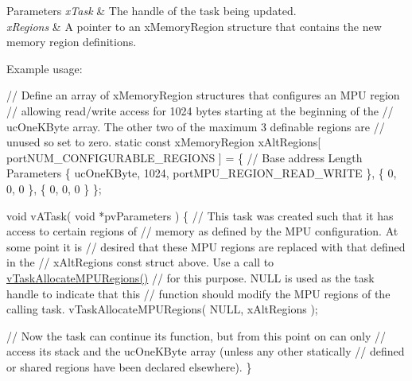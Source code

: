 \begin{DoxyParams}{Parameters}
{\em x\+Task} & The handle of the task being updated.\\
\hline
{\em x\+Regions} & A pointer to an x\+Memory\+Region structure that contains the new memory region definitions.\\
\hline
\end{DoxyParams}
Example usage\+: 
\begin{DoxyPre}
// Define an array of xMemoryRegion structures that configures an MPU region
// allowing read/write access for 1024 bytes starting at the beginning of the
// ucOneKByte array.  The other two of the maximum 3 definable regions are
// unused so set to zero.
static const xMemoryRegion xAltRegions[ portNUM\_CONFIGURABLE\_REGIONS ] =
\{
    // Base address     Length      Parameters
    \{ ucOneKByte,       1024,       portMPU\_REGION\_READ\_WRITE \},
    \{ 0,                0,          0 \},
    \{ 0,                0,          0 \}
\};\end{DoxyPre}



\begin{DoxyPre}void vATask( void *pvParameters )
\{
    // This task was created such that it has access to certain regions of
    // memory as defined by the MPU configuration.  At some point it is
    // desired that these MPU regions are replaced with that defined in the
    // xAltRegions const struct above.  Use a call to \mbox{\hyperlink{task_8h_a4fd3da9cc010ebb08743f613763c7924}{vTaskAllocateMPURegions()}}
    // for this purpose.  NULL is used as the task handle to indicate that this
    // function should modify the MPU regions of the calling task.
    vTaskAllocateMPURegions( NULL, xAltRegions );\end{DoxyPre}



\begin{DoxyPre}    // Now the task can continue its function, but from this point on can only
    // access its stack and the ucOneKByte array (unless any other statically
    // defined or shared regions have been declared elsewhere).
\}
   \end{DoxyPre}
 
